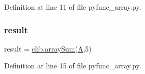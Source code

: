Definition at line 11 of file pyfunc\+\_\+array.\+py.

\mbox{\label{namespacepyfunc__array_a937d4dd628a8858b443a399410d2600b}} 
\subsubsection{\texorpdfstring{result}{result}}
{\footnotesize\ttfamily result = \mbox{\hyperlink{cfunc__array_8c_aaf3f2dce9468c7db115ed4cb5b0bd22d}{clib.\+array\+Sum}}(\mbox{\hyperlink{namespacepyfunc__array_a3b98e2dffc6cb06a89dcb0d5c60a0206}{A}},5)}



Definition at line 15 of file pyfunc\+\_\+array.\+py.

